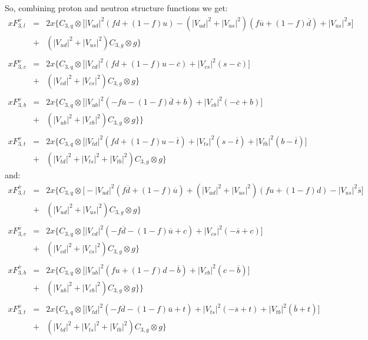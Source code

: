 \documentclass[10pt,a4paper]{article}
\begin{document}
So, combining proton and neutron structure functions we get:
\begin{equation}
\begin{array}{rcl}  
xF_{3,l}^{\nu} &=& 2x\Big\{C_{3,q}\otimes\Big[|V_{ud}|^2 (fd+(1-f)u) -\left(|V_{ud}|^2+|V_{us}|^2\right)(f\overline{u}+(1-f)\overline{d}) + |V_{us}|^2 s\Big]\\
                 &+& \left(|V_{ud}|^2+|V_{us}|^2\right)C_{3,g}\otimes g\Big\}\\
\\
xF_{3,c}^{\nu} &=& 2x\Big\{C_{3,q}\otimes\Big[|V_{cd}|^2(fd+(1-f)u-\overline{c}) + |V_{cs}|^2 (s-\overline{c})\Big]\\
                 &+& \left(|V_{cd}|^2+|V_{cs}|^2\right)C_{3,g}\otimes g\Big\}\\
\\
xF_{3,b}^{\nu} &=& 2x\Big\{C_{3,q}\otimes\Big[|V_{ub}|^2(-f\overline{u}-(1-f)\overline{d}+b) + |V_{cb}|^2 (-\overline{c}+b)\Big]\\
                 &+& \left(|V_{ub}|^2+|V_{cb}|^2\right)C_{3,g}\otimes g\Big\}\Big\}\\
\\
xF_{3,t}^{\nu} &=& 2x\Big\{C_{3,q}\otimes\Big[|V_{td}|^2 (fd +(1-f)u -\overline{t})+ |V_{ts}|^2(s-\overline{t}) + |V_{tb}|^2(b-\overline{t})\Big]\\
                 &+& \left(|V_{td}|^2 + |V_{ts}|^2 + |V_{tb}|^2\right)C_{3,g}\otimes g\Big\}
\end{array}
\end{equation}
and:
\begin{equation}
\begin{array}{rcl}  
xF_{3,l}^{\overline\nu} &=& 2x\Big\{C_{3,q}\otimes\Big[-|V_{ud}|^2 (f\overline{d}+(1-f)\overline{u}) +\left(|V_{ud}|^2+|V_{us}|^2\right)(fu+(1-f)d) - |V_{us}|^2 \overline{s}\Big]\\
                 &+& \left(|V_{ud}|^2+|V_{us}|^2\right)C_{3,g}\otimes g\Big\}\\
\\
xF_{3,c}^{\overline\nu} &=& 2x\Big\{C_{3,q}\otimes\Big[|V_{cd}|^2(-f\overline{d}-(1-f)\overline{u}+c) + |V_{cs}|^2 (-\overline{s}+c)\Big]\\
                 &+& \left(|V_{cd}|^2+|V_{cs}|^2\right)C_{3,g}\otimes g\Big\}\\
\\
xF_{3,b}^{\overline\nu} &=& 2x\Big\{C_{3,q}\otimes\Big[|V_{ub}|^2(fu+(1-f)d-\overline{b}) + |V_{cb}|^2 (c-\overline{b})\Big]\\
                 &+& \left(|V_{ub}|^2+|V_{cb}|^2\right)C_{3,g}\otimes g\Big\}\Big\}\\
\\
xF_{3,t}^{\overline\nu} &=& 2x\Big\{C_{3,q}\otimes\Big[|V_{td}|^2 (-f\overline{d}-(1-f)\overline{u}+t)+ |V_{ts}|^2(-\overline{s}+t) + |V_{tb}|^2(\overline{b}+t)\Big]\\
                 &+& \left(|V_{td}|^2 + |V_{ts}|^2 + |V_{tb}|^2\right)C_{3,g}\otimes g\Big\}
\end{array}
\end{equation}
\end{document}
